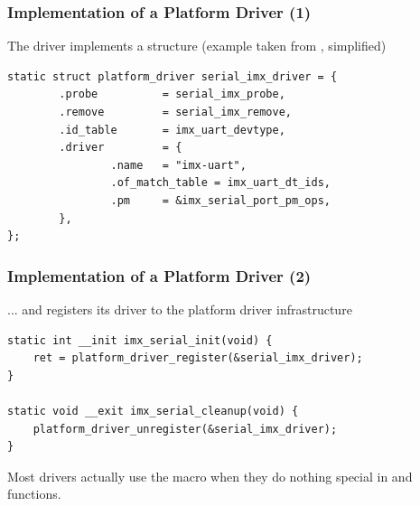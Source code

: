 \begin{frame}[fragile]
  \frametitle{Implementation of a Platform Driver (1)}
  The driver implements a 
  structure (example taken from ,
  simplified)
  \begin{block}{}
  \begin{verbatim}
static struct platform_driver serial_imx_driver = {
        .probe          = serial_imx_probe,
        .remove         = serial_imx_remove,
        .id_table       = imx_uart_devtype,
        .driver         = {
                .name   = "imx-uart",
                .of_match_table = imx_uart_dt_ids,
                .pm     = &imx_serial_port_pm_ops,
        },
};
\end{verbatim}
\end{block}
\end{frame}


\begin{frame}[fragile]
  \frametitle{Implementation of a Platform Driver (2)}
  ... and registers its driver to the platform driver infrastructure
  \begin{block}{}
  \begin{verbatim}
static int __init imx_serial_init(void) {
    ret = platform_driver_register(&serial_imx_driver);
}

static void __exit imx_serial_cleanup(void) {
    platform_driver_unregister(&serial_imx_driver);
}
  \end{verbatim}
\end{block}
Most drivers actually use the 
macro when they do nothing special in  and  functions.
\end{frame}

